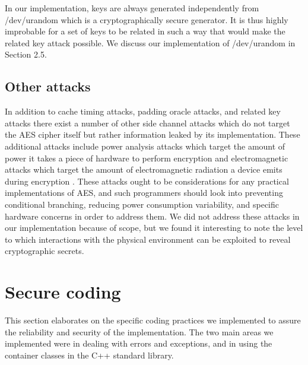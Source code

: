 \documentclass[a4paper,12pt]{article}
\begin{document}
In our implementation, keys are always generated independently from /dev/urandom which is a cryptographically secure generator. It is thus highly improbable for a set of keys to be related in such a way that would make the related key attack possible. We discuss our implementation of /dev/urandom in Section 2.5.

\subsection{Other attacks}

In addition to cache timing attacks, padding oracle attacks, and related key attacks there exist a number of other side channel attacks which do not target the AES cipher itself but rather information leaked by its implementation. These additional attacks include power analysis attacks which target the amount of power it takes a piece of hardware to perform encryption and electromagnetic attacks which target the amount of electromagnetic radiation a device emits during encryption \cite{Boneh}. These attacks ought to be considerations for any practical implementations of AES, and such programmers should look into preventing conditional branching, reducing power consumption variability, and specific hardware concerns in order to address them. We did not address these attacks in our implementation because of scope, but we found it interesting to note the level to which interactions with the physical environment can be exploited to reveal cryptographic secrets.

\section{Secure coding}
This section elaborates on the specific coding practices we implemented to assure the reliability and security of the implementation. The two main areas we implemented were in dealing with errors and exceptions, and in using the container classes in the C++ standard library.
\end{document}
